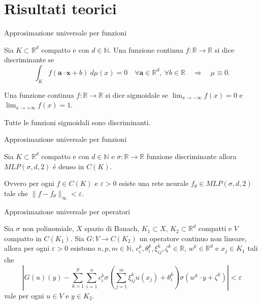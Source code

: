 \documentclass[aspectratio=169]{beamer}
\newcommand{\numberset}{\mathbb}
\newcommand{\N}{\numberset{N}}
\newcommand{\R}{\numberset{R}}
\begin{document}
\section{Risultati teorici}
\sectionpage

\begin{frame}{Approsimazione universale per funzioni}
    \begin{definition}
        Sia $K \subset \R^{d}$ compatto e con $d \in \N$. Una funzione continua $f: \R \to \R$ si dice discriminante se
        \[
        \int_{K} f(\textbf{a}\cdot \textbf{x} +b) \ d\mu(x) = 0 \quad \forall \textbf{a} \in \R^{d},\ \forall b \in \R \quad \Rightarrow \quad \mu \equiv 0.
        \]
    \end{definition}
    \pause
    \begin{definition}
        Una funzione continua $f: \R \to \R$ si dice sigmoidale se $ \lim_{x \to -\infty} f(x) = 0$ e $\lim_{x \to +\infty} f(x) = 1$.
    \end{definition}
    \pause
    Tutte le funzioni sigmoidali sono discriminanti.
\end{frame}

\begin{frame}{Approsimazione universale per funzioni}
\begin{theorem}
    Sia $K \subset \R^{d}$ compatto e con $d \in \N$ e $\sigma: \R \to \R$ funzione discriminante allora $MLP(\sigma, d, 2)$ \'e denso in $C(K)$.
\end{theorem}
Ovvero per ogni $f \in C(K)$ e $\varepsilon > 0$ esiste una rete neurale $f_{\theta} \in MLP(\sigma, d, 2)$ tale che $\|f - f_{\theta}\|_{\infty} < \varepsilon$.
\end{frame}

\begin{frame}{Approsimazione universale per operatori}
    \begin{theorem}
        Sia $\sigma$ non polinomiale, $X$ spazio di Banach, $ K_1 \subset X $, $ K_2 \subset \R^d $ compatti e $ V $ compatto in $ C(K_1) $. Sia $ G: V \to C(K_2) $ un operatore continuo non lineare, allora per ogni $ \varepsilon > 0 $ esistono $ n, p, m \in \N $, $ c_i^k, \theta_i^k, \xi_{ij}^k, \zeta^k \in \R $, $ w^k \in \R^d $ e $ x_j \in K_1 $ tali che
        \[ \left| G(u)(y) - \sum_{k=1}^{p}\sum_{i=1}^{n}c_i^k \sigma \left( \sum_{j=1}^{m} \xi_{ij}^k u(x_j) + \theta_i^k \right) \sigma(w^k \cdot y + \zeta^k) \right| < \varepsilon  \]
        vale per ogni $ u \in V $ e $ y \in K_2 $.
    \end{theorem}
\end{frame}
\end{document}
